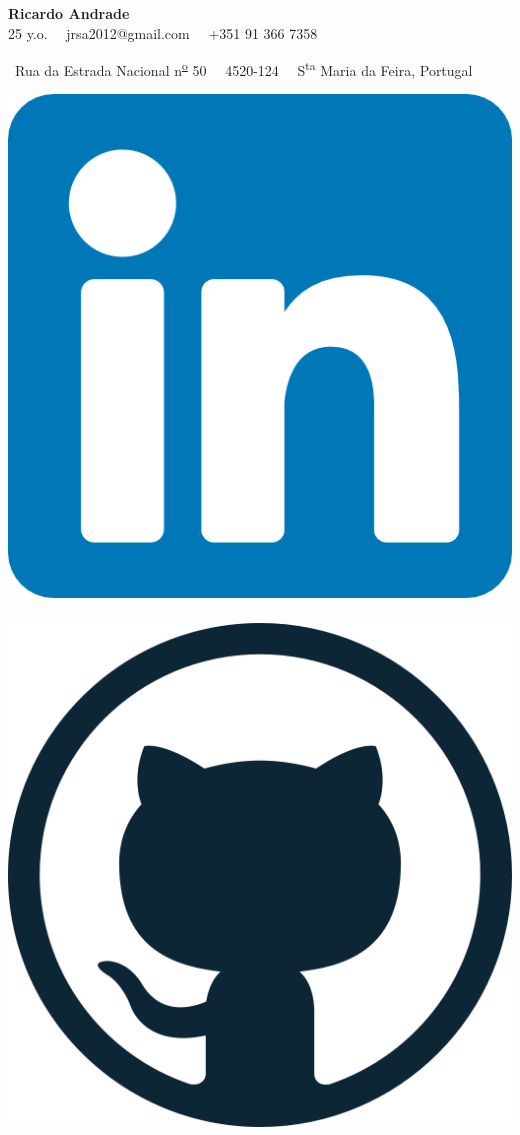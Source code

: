 \documentclass{mycv}
\begin{document}
\begin{center}
	{\LARGE\textbf{Ricardo Andrade}} \\
	\vspace{0.2cm}
	25 y.o.~\textbullet
	\ jrsa2012@gmail.com~\textbullet 
	\ +351 91 366 7358
	
	\ Rua da Estrada Nacional n\textsuperscript{\underline{o}} 50~\textbullet
	\ 4520-124~\textbullet
	\ S\textsuperscript{ta} Maria da Feira, Portugal
	
	\vspace{0.3cm}
	
	\href{www.linkedin.com/in/jrsa2012}{\includegraphics[scale=0.035]{figs/linkedin_logo.png}}
	\ \ \
	\href{https://github.com/jrsa2012}{\includegraphics[scale=0.02]{figs/github_logo.png}}

\end{center}
\end{document}
